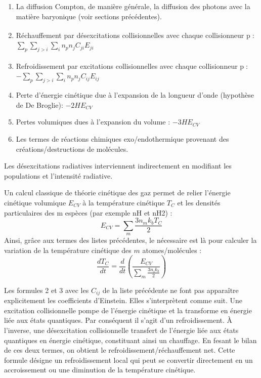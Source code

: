 \documentclass[10pt, a4paper]{report}
\numberwithin{equation}{subsection}
\begin{document}
\begin{enumerate}
	\item La diffusion Compton, de manière générale, la diffusion des photons avec la matière baryonique (voir sections précédentes).
	\item Réchauffement par désexcitations collisionnelles avec chaque collisionneur p\textsuperscript{\cite{RADEX} \cite{KWO}} :\\ $\sum\limits_p\sum\limits_{j>i}\sum\limits_i n_p n_j C_{ji}E_{ji}$
	\item Refroidissement par excitations collisionnelles avec chaque collisionneur p\textsuperscript{\cite{RADEX} \cite{KWO}} :\\ $-\sum\limits_p\sum\limits_{j>i}\sum\limits_i n_p n_j C_{ij}E_{ij}$
	\item Perte d'énergie cinétique due à l'expansion de la longueur d'onde (hypothèse de De Broglie): $-2H E_{CV}$
	\item Pertes volumiques dues à l'expansion du volume : $-3H E_{CV}$
	\item Les termes de réactions chimiques exo/endothermique provenant des créations/destructions de molécules.
\end{enumerate}
\medskip
\normalsize
Les désexcitations radiatives interviennent indirectement en modifiant les populations et l'intensité radiative.

Un calcul classique de théorie cinétique des gaz permet de relier l'énergie cinétique volumique $E_{CV}$ à la température cinétique $T_C$ et les densités particulaires des m espèces (par exemple nH et nH2) :
\begin{equation} \label{eq:ECTC}
 \boxed{E_{CV} = \sum\limits_m  \frac{3 n_m k_b T_C}{2}}
\end{equation}
Ainsi, grâce aux termes des listes précédentes, le nécessaire est là pour calculer la variation de la température cinétique des $m$ atomes/molécules :
\begin{equation} \label{eq:VTC}
 \boxed{\frac{dT_C }{dt} = \frac{d}{dt}\left(\frac{E_{CV}}{\sum\limits_m  \frac{3 n_i k_b}{2}}\right)}
\end{equation}

Les formules 2 et 3 avec les $C_{ij}$ de la liste précédente ne font pas apparaître explicitement les coefficients d'Einstein. Elles s'interprètent comme suit. Une excitation collisionnelle pompe de l'énergie cinétique et la transforme en énergie liée aux états quantiques. Par conséquent il s'agit d'un refroidissement. À l'inverse, une désexcitation collisionnelle transfert de l'énergie liée aux états quantiques en énergie cinétique, constituant ainsi un chauffage. En fesant le bilan de ces deux termes, on obtient le refroidissement/réchauffement net. Cette formule désigne un refroidissement local qui peut se convertir directement en un accroissement ou une diminution de la température cinétique.
\end{document}
